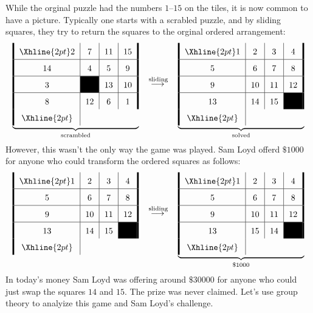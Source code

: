 \documentclass{ximera}
\begin{document}
While the orginal puzzle had the numbers $1$--$15$ on the tiles, it is
now common to have a picture. Typically one starts with a scrabled
puzzle, and by sliding squares, they try to return the squares to the
orginal ordered arrangement:
\[
\arraycolsep=6pt\def\arraystretch{1.6}
\underbrace{\begin{array}{!{\vline width 2pt}c|c|c|c!{\vline width 2pt}}
    \Xhline{2pt}
    2 & 7  & 11 & 15\\ \hline
    14 & 4  & 5  & 9 \\ \hline
    3  &  \cellcolor{black}  & 13 & 10  \\ \hline
    8  & 12 & 6 & 1 \\%
    \Xhline{2pt}
\end{array}}_{\text{scrambled}}
\quad\lto^{\text{sliding}}\quad
\underbrace{\begin{array}{!{\vline width 2pt}c|c|c|c!{\vline width 2pt}}
    \Xhline{2pt}
    1  & 2  & 3  & 4 \\ \hline
    5  & 6  & 7  & 8 \\ \hline
    9  & 10 & 11 & 12 \\ \hline
    13 & 14 & 15 & \cellcolor{black}\\%
    \Xhline{2pt}
\end{array}}_{\text{solved}}
\]
However, this wasn't the only way the game was played. Sam Loyd offerd
$\$1000$ for anyone who could transform the ordered squares as
follows:
\[
\arraycolsep=6pt\def\arraystretch{1.6}
\begin{array}{!{\vline width 2pt}c|c|c|c!{\vline width 2pt}}
    \Xhline{2pt}
    1  & 2  & 3  & 4 \\ \hline
    5  & 6  & 7  & 8 \\ \hline
    9  & 10 & 11 & 12 \\ \hline
    13 & 14 & 15 & \cellcolor{black} \\
    \Xhline{2pt}
\end{array}\quad\lto^{\text{sliding}}\quad
\underbrace{\begin{array}{!{\vline width 2pt}c|c|c|c!{\vline width 2pt}}
    \Xhline{2pt}
    1  & 2  & 3  & 4 \\ \hline
    5  & 6  & 7  & 8 \\ \hline
    9  & 10 & 11 & 12 \\ \hline
    13 & 15 & 14 & \cellcolor{black} \\
    \Xhline{2pt}
\end{array}}_{\$1000}
\]
In today's money Sam Loyd was offering around $\$30000$ for anyone who
could just swap the squares $14$ and $15$. The prize was never
claimed. Let's use group theory to analyize this game and Sam Loyd's
challenge.
\end{document}
